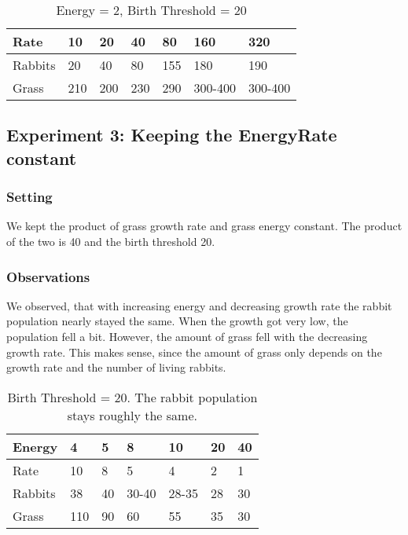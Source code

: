 \documentclass[11pt]{article}
\begin{document}
\begin{table}[]
	\centering
	\caption{Energy = 2, Birth Threshold = 20}
	\label{my-label}
	\begin{tabular}{@{}lllllll@{}}
		\toprule
		Rate    & 10  & 20  & 40  & 80  & 160     & 320     \\ \midrule
		Rabbits & 20  & 40  & 80  & 155 & 180     & 190     \\
		Grass   & 210 & 200 & 230 & 290 & 300-400 & 300-400 \\ \bottomrule
	\end{tabular}
\end{table}

\subsection{Experiment 3: Keeping the Energy\texttimes Rate constant}

\subsubsection{Setting}
We kept the product of grass growth rate and grass energy constant.
The product of the two is 40 and the birth threshold 20.

\subsubsection{Observations}
We observed, that with increasing energy and decreasing growth rate the rabbit population nearly stayed the same.
When the growth got very low, the population fell a bit.
However, the amount of grass fell with the decreasing growth rate.
This makes sense, since the amount of grass only depends on the growth rate and the number of living rabbits.
\begin{table}[]
	\centering
	\caption{Birth Threshold = 20. The rabbit population stays roughly the same.}
	\label{my-label}
	\begin{tabular}{@{}lllllll@{}}
		\toprule
		Energy  & 4   & 5  & 8     & 10    & 20 & 40 \\ \midrule
		Rate    & 10  & 8  & 5     & 4     & 2  & 1  \\
		Rabbits & 38  & 40 & 30-40 & 28-35 & 28 & 30 \\
		Grass   & 110 & 90 & 60    & 55    & 35 & 30 \\ \bottomrule
	\end{tabular}
\end{table}
\end{document}
